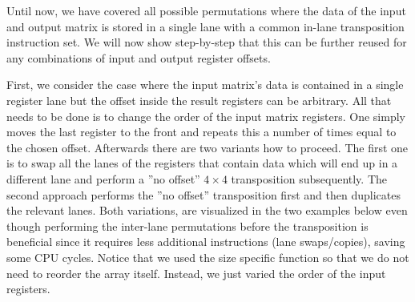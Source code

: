 Until now, we have covered all possible permutations where the data of the input and output matrix is stored in a single lane with a common in-lane transposition instruction set.
We will now show step-by-step that this can be further reused for any combinations of input and output register offsets.

First, we consider the case where the input matrix's data is contained in a single register lane but the offset inside the result registers can be arbitrary.
All that needs to be done is to change the order of the input matrix registers.
One simply moves the last register to the front and repeats this a number of times equal to the chosen offset.
Afterwards there are two variants how to proceed.
The first one is to swap all the lanes of the registers that contain data which will end up in a different lane and perform a ''no offset'' $4 \times 4$ transposition subsequently.
The second approach performs the ''no offset'' transposition first and then duplicates the relevant lanes.
Both variations, are visualized in the two examples below even though performing the inter-lane permutations before the transposition is beneficial since it requires less additional instructions (lane swaps/copies), saving some CPU cycles.
Notice that we used the size specific  function so that we do not need to reorder the array  itself.
Instead, we just varied the order of the input registers.

